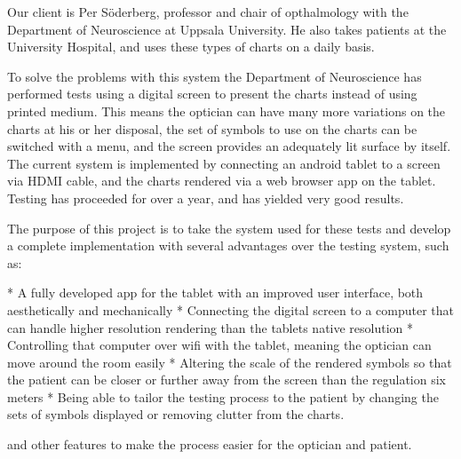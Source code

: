 \documentclass{article}
\begin{document}


Our client is Per Söderberg, professor and chair of opthalmology with the Department of Neuroscience at Uppsala University. He also takes patients at the University Hospital, and uses these types of charts on a daily basis. 


To solve the problems with this system the Department of Neuroscience has performed tests using a digital screen to present the charts instead of using printed medium. This means the optician can have many more variations on the charts at his or her disposal, the set of symbols to use on the charts can be switched with a menu, and the screen provides an adequately lit surface by itself. The current system is implemented by connecting an android tablet to a screen via HDMI cable, and the charts rendered via a web browser app on the tablet. Testing has proceeded for over a year, and has yielded very good results.

The purpose of this project is to take the system used for these tests and develop a complete implementation with several advantages over the testing system, such as:

* A fully developed app for the tablet with an improved user interface, both aesthetically and mechanically
* Connecting the digital screen to a computer that can handle higher resolution rendering than the tablets native resolution
* Controlling that computer over wifi with the tablet, meaning the optician can move around the room easily
* Altering the scale of the rendered symbols so that the patient can be closer or further away from the screen than the regulation six meters
* Being able to tailor the testing process to the patient by changing the sets of symbols displayed or removing clutter from the charts.

and other features to make the process easier for the optician and patient.
\end{document}

